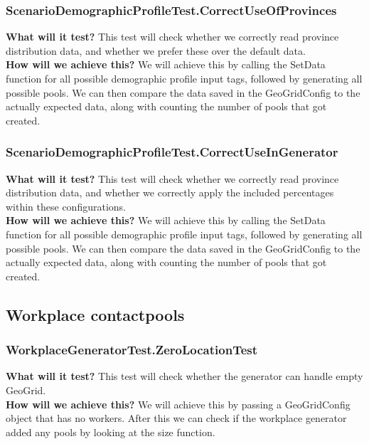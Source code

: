 \documentclass{article}
\begin{document}
\subsubsection{ScenarioDemographicProfileTest.CorrectUseOfProvinces}
\textbf{What will it test?} 
This test will check whether we correctly read province distribution data, and whether we prefer these over the default data. \\
\newline
\textbf{How will we achieve this?}
We will achieve this by calling the SetData function for all possible demographic profile input tags, followed by generating all possible pools. We can then compare the data saved in the GeoGridConfig to the actually expected data, along with counting the number of pools that got created.

\subsubsection{ScenarioDemographicProfileTest.CorrectUseInGenerator}
\textbf{What will it test?} 
This test will check whether we correctly read province distribution data, and whether we correctly apply the included percentages within these configurations. \\
\newline
\textbf{How will we achieve this?}
We will achieve this by calling the SetData function for all possible demographic profile input tags, followed by generating all possible pools. We can then compare the data saved in the GeoGridConfig to the actually expected data, along with counting the number of pools that got created.

\subsection{Workplace contactpools}

\subsubsection{WorkplaceGeneratorTest.ZeroLocationTest}
\textbf{What will it test?}
This test will check whether the generator can handle empty GeoGrid.\\
\newline
\textbf{How will we achieve this?}
We will achieve this by passing a GeoGridConfig object that has no workers. After this we can check if the workplace generator added any pools by looking at the size function.
\end{document}
